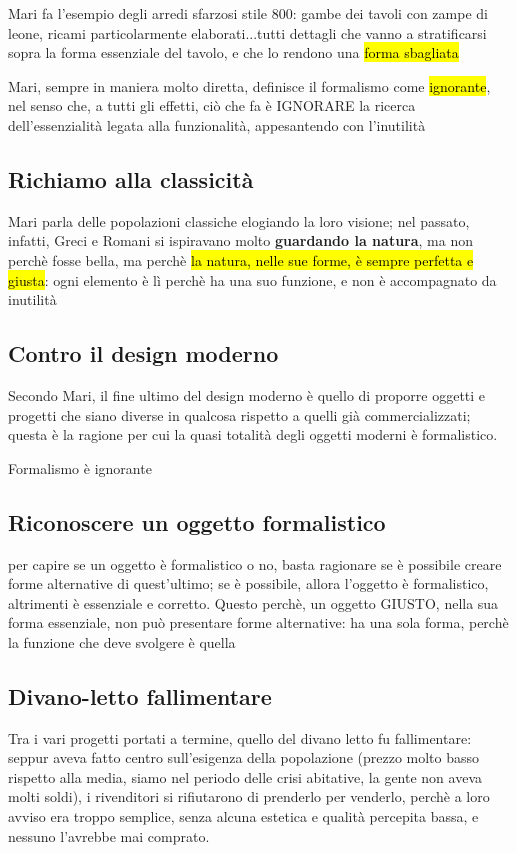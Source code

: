 Mari fa l'esempio degli arredi sfarzosi stile 800: gambe dei tavoli con zampe di leone, ricami particolarmente elaborati...tutti dettagli che vanno a stratificarsi sopra la forma essenziale del tavolo, e che lo rendono una \hl{forma sbagliata}

\begin{mdframed}[style=mystyle,frametitle=il formalismo è ignorante]
 Mari, sempre in maniera molto diretta, definisce il formalismo come \hl{ignorante}, nel senso che, a tutti gli effetti, ciò che fa è IGNORARE la ricerca dell'essenzialità legata alla funzionalità, appesantendo con l'inutilità
 \end{mdframed}

\subsection{Richiamo alla classicità}
Mari parla delle popolazioni classiche elogiando la loro visione; nel passato, infatti, Greci e Romani si ispiravano molto \textbf{guardando la natura}, ma non perchè fosse bella, ma perchè \hl{la natura, nelle sue forme, è sempre perfetta e giusta}: ogni elemento è lì perchè ha una suo funzione, e non è accompagnato da inutilità

\subsection{Contro il design moderno}
Secondo Mari, il fine ultimo del design moderno è quello di proporre oggetti e progetti che siano diverse in qualcosa rispetto a quelli già commercializzati; questa è la ragione per cui la quasi totalità degli oggetti moderni è formalistico.

Formalismo è ignorante

\subsection{Riconoscere un oggetto formalistico}
per capire se un oggetto è formalistico o no, basta ragionare se è possibile creare forme alternative di quest'ultimo; se è possibile, allora l'oggetto è formalistico, altrimenti è essenziale e corretto. Questo perchè, un oggetto GIUSTO, nella sua forma essenziale, non può presentare forme alternative: ha una sola forma, perchè la funzione che deve svolgere è quella

\subsection{Divano-letto fallimentare}
Tra i vari progetti portati a termine, quello del divano letto fu fallimentare: seppur aveva fatto centro sull'esigenza della popolazione (prezzo molto basso rispetto alla media, siamo nel periodo delle crisi abitative, la gente non aveva molti soldi), i rivenditori si rifiutarono di prenderlo per venderlo, perchè a loro avviso era troppo semplice, senza alcuna estetica e qualità percepita bassa, e nessuno l'avrebbe mai comprato.
